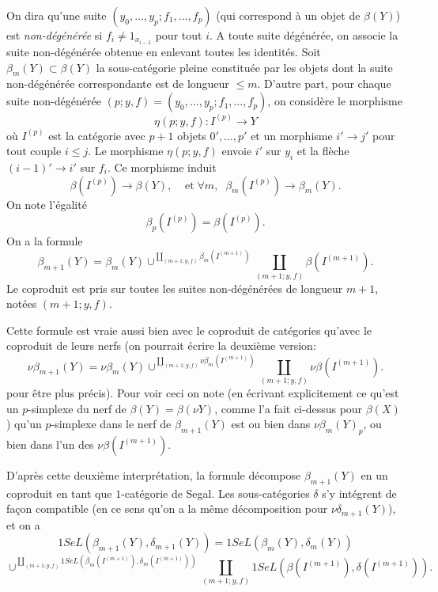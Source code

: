 \documentclass[12pt]{article}
\begin{document}
On dira
qu'une suite $(y_0,\ldots , y_p; f_1,\ldots , f_p)$ (qui correspond \`a un
objet de $\beta (Y)$) est {\em non-d\'eg\'en\'er\'ee} si $f_i\neq 1_{x_{i-1}}$
pour tout $i$. A toute suite d\'eg\'en\'er\'ee, on associe la suite
non-d\'eg\'en\'er\'ee obtenue en enlevant toutes les identit\'es. Soit $\beta
_m(Y)\subset \beta (Y)$ la sous-cat\'egorie pleine constitu\'ee
par les objets dont la
suite  non-d\'eg\'en\'er\'ee correspondante est de longueur $\leq m$.  D'autre
part, pour chaque suite non-d\'eg\'en\'er\'ee  $(p; y,f)=(y_0,\ldots , y_p;
f_1,\ldots , f_p)$, on consid\`ere le morphisme
$$
\eta (p; y,f): I^{(p)}\rightarrow Y
$$
o\`u $I^{(p)}$ est la cat\'egorie avec $p+1$ objets $0',\ldots , p'$ et un
morphisme $i'\rightarrow j'$ pour tout couple $i\leq j$. Le morphisme
$\eta (p; y,f)$ envoie $i'$ sur $y_i$ et la fl\`eche $(i-1)'\rightarrow i'$ sur
$f_i$. Ce morphisme induit
$$
\beta (I^{(p)})\rightarrow \beta (Y),\;\;\;\; \mbox{et} \; \forall m,\;\;
\beta _m (I^{(p)})\rightarrow \beta _m(Y).
$$
On note l'\'egalit\'e
$$
\beta _p(I^{(p)})=\beta (I^{(p)}).
$$
On a la formule
$$
\beta _{m+1}(Y)= \beta _{m}(Y) \cup ^{\coprod _{(m+1; y,f)}\beta _m(I^{(m+1)})}
\coprod _{(m+1; y,f)}\beta (I^{(m+1)}).
$$
Le coproduit est pris sur toutes les suites non-d\'eg\'en\'er\'ees de longueur
$m+1$, not\'ees $(m+1; y,f)$.

Cette formule est vraie aussi bien avec le coproduit de cat\'egories qu'avec
le coproduit de leurs nerfs (on pourrait \'ecrire la deuxi\`eme version:
$$
\nu \beta _{m+1}(Y)= \nu \beta _{m}(Y) \cup ^{\coprod _{(m+1; y,f)}\nu \beta
_m(I^{(m+1)})}  \coprod _{(m+1; y,f)}\nu \beta (I^{(m+1)}).
$$
pour \^etre plus pr\'ecis).
Pour voir ceci on note (en \'ecrivant explicitement ce qu'est un
$p$-simplexe du nerf de $\beta (Y)= \beta (\nu Y)$, comme  l'a fait ci-dessus
pour $\beta (X)$) qu'un $p$-simplexe dans le nerf de $\beta _{m+1}(Y)$ est ou
bien dans $\nu \beta _{m}(Y)_p$, ou bien dans l'un des
$\nu \beta (I^{(m+1)})$.

D'apr\`es cette deuxi\`eme interpr\'etation,
la formule d\'ecompose $\beta _{m+1}(Y)$
en un coproduit en tant que $1$-cat\'egorie de Segal. Les sous-cat\'egories
$\delta$
s'y int\'egrent de fa\c{c}on compatible (en
ce sens qu'on a la m\^eme d\'ecomposition
pour $\nu \delta _{m+1}(Y)$), et on a
$$
1SeL(\beta _{m+1}(Y), \delta  _{m+1}(Y)) =
1SeL(\beta _{m}(Y),\delta _m(Y))
$$
$$
\cup ^{\coprod _{(m+1; y,f)}1SeL(\beta
_m(I^{(m+1)}),\delta _m(I^{(m+1)}))}  \coprod _{(m+1; y,f)} 1SeL(\beta
(I^{(m+1)}),\delta (I^{(m+1)})).
$$
\end{document}

